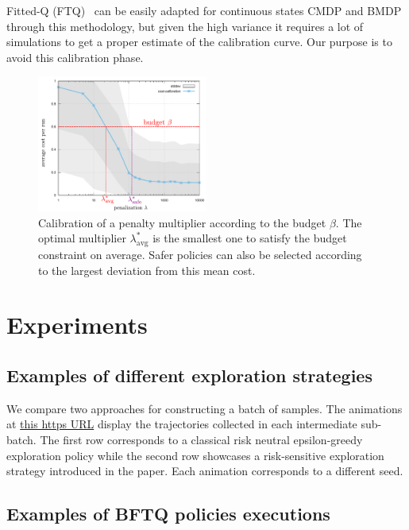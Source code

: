Fitted-Q (FTQ)~\citep{Ernst2005,Riedmiller2005} can be easily adapted for continuous states CMDP and BMDP through this methodology, but given the high variance it requires a lot of simulations to get a proper estimate of the calibration curve. Our purpose is to avoid this calibration phase.

\begin{figure}[tp]
    \centering
    \includegraphics[width=0.5\textwidth]{source/img/CalibrationExample}
    \caption{Calibration of a penalty multiplier according to the budget $\beta$. The optimal multiplier $\lambda^*_{\text{avg}}$ is the smallest one to satisfy the budget constraint on average. Safer policies can also be selected according to the largest deviation from this mean cost.}
    \label{fig:Lagrangian}
\end{figure}


\section{Experiments}
\label{sec:exp-supp}


\subsection{Examples of different exploration strategies}
\label{subsec:exploration-examples}
We compare two approaches for constructing a batch of samples. The animations at  \href{https://budgeted-rl.github.io/\#risk-sensitive-exploration}{this https URL} display the trajectories collected in each intermediate sub-batch. The first row corresponds to a classical  risk neutral epsilon-greedy exploration policy while the second row showcases a risk-sensitive exploration strategy introduced in the paper. Each animation corresponds to a different seed.

\subsection{Examples of BFTQ policies executions}
\label{sec:bftq-executions}


